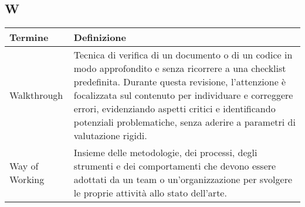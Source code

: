 \documentclass[10pt]{article}
\begin{document}
\subsection{W} %
\begin{longtable}{|>{\centering\arraybackslash}m{2.5cm}|>{\arraybackslash}m{12.5cm}|}
\hline
\rowcolor[gray]{0.8}
\textbf{Termine} & \textbf{Definizione}\\
\endhead
\hline
Walkthrough & Tecnica di verifica di un documento o di un codice in modo approfondito e senza ricorrere a una checklist predefinita. Durante questa revisione, l'attenzione è focalizzata sul contenuto per individuare e correggere errori, evidenziando aspetti critici e identificando potenziali problematiche, senza aderire a parametri di valutazione rigidi.\\
\hline
Way of Working & Insieme delle metodologie, dei processi, degli strumenti e dei comportamenti che devono essere adottati da un team o un'organizzazione per svolgere le proprie attività allo stato dell'arte.\\
\hline
\end{longtable}


\end{document}
